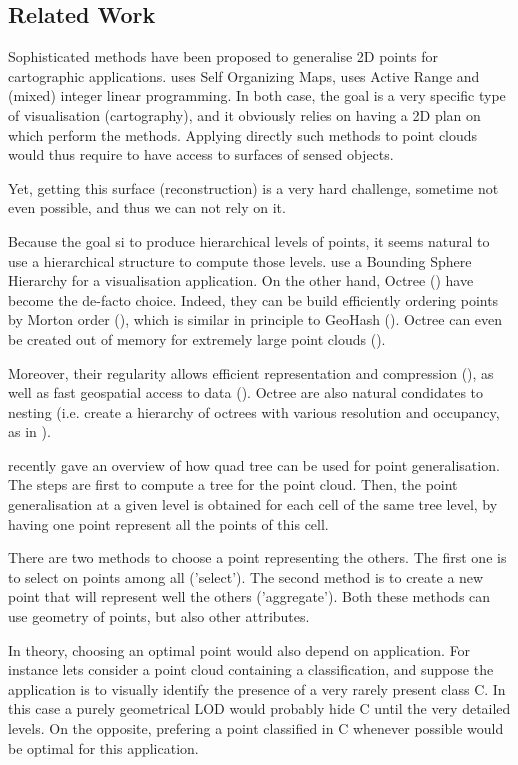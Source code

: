 \subsection{Related Work} 

	Sophisticated methods have been proposed to generalise 2D points for cartographic applications. \cite{Sester2001} uses Self Organizing Maps, \cite{Schwartges2013} uses Active Range and (mixed) integer
	linear programming.
	In both case, the goal is a very specific type of visualisation (cartography), and it obviously relies on having a 2D plan on which perform the methods.
	Applying directly such methods to point clouds would thus require to have access to surfaces of sensed objects.
	
	Yet, getting this surface (reconstruction) is a very hard challenge, sometime not even possible, and thus we can not rely on it.
	
	Because the goal si to produce hierarchical levels of points, it seems natural to use a hierarchical structure to compute those levels.
	\cite{Rusinkiewicz2000} use a Bounding Sphere Hierarchy for a visualisation application.
	On the other hand, Octree (\cite{Meagher1982}) have become the de-facto choice.
	Indeed, they can be build efficiently ordering points by Morton order (\cite{Feng2014}),
	which is similar in principle to GeoHash (\cite{Sabo2014}).
	Octree can even be created out of memory for extremely large point clouds (\cite{Baert2014}). 
	
	Moreover, their regularity allows efficient representation and compression (\cite{Schnabel2006,Huang2006}), as well as fast geospatial access to data (\cite{Elseberg2013}).
	Octree are also natural condidates to nesting (i.e. create a hierarchy of octrees with various resolution and occupancy, as in \cite{Hornung2013}). 
	
	
	\cite{Bereuter2015} recently gave an overview of how quad tree can be used for point generalisation.
	The steps are first to compute a tree for the point cloud.
	Then, the point generalisation at a given level is obtained for each cell of the same tree level, by having one point represent all the points of this cell.
	
	There are two methods to choose a point representing the others. The first one is to select on points among all ('select').
	The second method is to create a new point that will represent well the others ('aggregate'). 
	Both these methods can use geometry of points, but also other attributes.
	
	In theory, choosing an optimal point would also depend on application.
	For instance lets consider a point cloud containing a classification, and suppose the application is to visually identify the presence of a very rarely present class C.
	In this case a purely geometrical LOD would probably hide C until the very detailed levels. On the opposite, prefering a point classified in C whenever possible would be optimal for this application.
	
